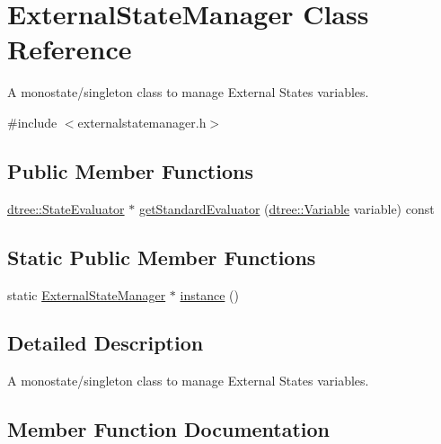 \hypertarget{class_external_state_manager}{}\section{External\+State\+Manager Class Reference}
\label{class_external_state_manager}


A monostate/singleton class to manage External States variables.  




{\ttfamily \#include $<$externalstatemanager.\+h$>$}

\subsection*{Public Member Functions}
\begin{DoxyCompactItemize}
\item 
\mbox{\hyperlink{classdtree_1_1_state_evaluator}{dtree\+::\+State\+Evaluator}} $\ast$ \mbox{\hyperlink{class_external_state_manager_ad3f2f0fe30bec4901512b9b12124a318}{get\+Standard\+Evaluator}} (\mbox{\hyperlink{namespacedtree_a79fe30831a14df904319f9e783b3189b}{dtree\+::\+Variable}} variable) const
\end{DoxyCompactItemize}
\subsection*{Static Public Member Functions}
\begin{DoxyCompactItemize}
\item 
static \mbox{\hyperlink{class_external_state_manager}{External\+State\+Manager}} $\ast$ \mbox{\hyperlink{class_external_state_manager_a6d689daf90a0bc8b83c3f0db10877251}{instance}} ()
\end{DoxyCompactItemize}


\subsection{Detailed Description}
A monostate/singleton class to manage External States variables. 

\subsection{Member Function Documentation}
\mbox{\label{class_external_state_manager_ad3f2f0fe30bec4901512b9b12124a318}} 
